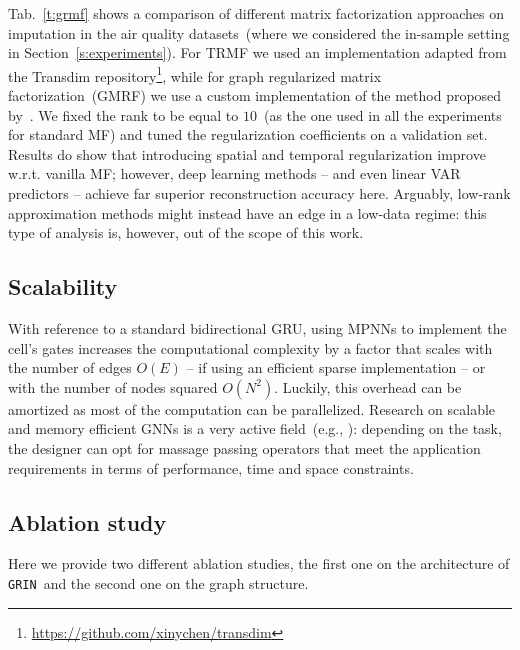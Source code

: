 \documentclass{article} \usepackage{iclr2022_conference,times}
\newcommand{\GRIL}{\texttt{GRIN}}
\begin{document}
Tab.~\ref{t:grmf} shows a comparison of different matrix factorization approaches on imputation in the air quality datasets~(where we considered the in-sample setting in Section~\ref{s:experiments}). For TRMF we used an implementation adapted from the Transdim repository\footnote{\url{https://github.com/xinychen/transdim}}, while for graph regularized matrix factorization~(GMRF) we use a custom implementation of the method proposed by~\citet{cai2010graph}. We fixed the rank to be equal to $10$~(as the one used in all the experiments for standard MF) and tuned the regularization coefficients on a validation set. Results do show that introducing spatial and temporal regularization improve w.r.t. vanilla MF; however, deep learning methods -- and even linear VAR predictors -- achieve far superior reconstruction accuracy here. Arguably, low-rank approximation methods might instead have an edge in a low-data regime: this type of analysis is, however, out of the scope of this work.

\subsection{Scalability}

With reference to a standard bidirectional GRU, using MPNNs to implement the cell's gates increases the computational complexity by a factor that scales with the number of edges $O(E)$ -- if using an efficient sparse implementation -- or with the number of nodes squared $O(N^2)$. Luckily, this overhead can be amortized as most of the computation can be parallelized. Research on scalable and memory efficient GNNs is a very active field~(e.g., \citealp{hamilton2017inductive, frasca2021sign}): depending on the task, the designer can opt for massage passing operators that meet the application requirements in terms of performance, time and space constraints.

\subsection{Ablation study}

Here we provide two different ablation studies, the first one on the architecture of \GRIL\ and the second one on the graph structure.
\end{document}
